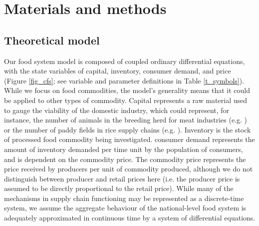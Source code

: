 \documentclass[12pt]{article}
\begin{document}
\section{Materials and methods}

\subsection{Theoretical model}
Our food system model is composed of coupled ordinary differential equations, with the state variables of capital, inventory, consumer demand, and price (Figure \ref{fig_cfs}; see variable and parameter definitions in Table \ref{t_symbols}). While we focus on food commodities, the model's generality means that it could be applied to other types of commodity. Capital represents a raw material used to gauge the viability of the domestic industry, which could represent, for instance, the number of animals in the breeding herd for meat industries (e.g. \cite{meadows1971}) or the number of paddy fields in rice supply chains (e.g. \cite{chung2018}). Inventory is the stock of processed food commodity being investigated. consumer demand represents the amount of inventory demanded per time unit by the population of consumers, and is dependent on the commodity price. The commodity price represents the price received by producers per unit of commodity produced, although we do not distinguish between producer and retail prices here (i.e. the producer price is assumed to be directly proportional to the retail price). While many of the mechanisms in supply chain functioning may be represented as a discrete-time system, we assume the aggregate behaviour of the national-level food system is adequately approximated in continuous time by a system of differential equations.
\end{document}
